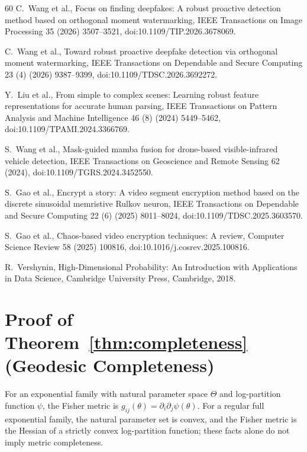 \documentclass[a4paper,fleqn]{cas-dc}
\begin{document}
\begin{thebibliography}{60}
C.~Wang et al., Focus on finding deepfakes: A robust proactive detection method based on orthogonal moment watermarking, IEEE Transactions on Image Processing 35 (2026) 3507--3521, doi:10.1109/TIP.2026.3678069.

C.~Wang et al., Toward robust proactive deepfake detection via orthogonal moment watermarking, IEEE Transactions on Dependable and Secure Computing 23 (4) (2026) 9387--9399, doi:10.1109/TDSC.2026.3692272.

Y.~Liu et al., From simple to complex scenes: Learning robust feature representations for accurate human parsing, IEEE Transactions on Pattern Analysis and Machine Intelligence 46 (8) (2024) 5449--5462, doi:10.1109/TPAMI.2024.3366769.

S.~Wang et al., Mask-guided mamba fusion for drone-based visible-infrared vehicle detection, IEEE Transactions on Geoscience and Remote Sensing 62 (2024), doi:10.1109/TGRS.2024.3452550.

S.~Gao et al., Encrypt a story: A video segment encryption method based on the discrete sinusoidal memristive Rulkov neuron, IEEE Transactions on Dependable and Secure Computing 22 (6) (2025) 8011--8024, doi:10.1109/TDSC.2025.3603570.

S.~Gao et al., Chaos-based video encryption techniques: A review, Computer Science Review 58 (2025) 100816, doi:10.1016/j.cosrev.2025.100816.

R.~Vershynin, High-Dimensional Probability: An Introduction with Applications in Data Science, Cambridge University Press, Cambridge, 2018.

\end{thebibliography}

\appendix

\section{Proof of Theorem~\ref{thm:completeness} (Geodesic Completeness)}
\label{app:completeness}

For an exponential family with natural parameter space $\Theta$ and
log-partition function $\psi$, the Fisher metric is
$g_{ij}(\theta) = \partial_i\partial_j\psi(\theta)$.  For a regular full exponential family, the natural parameter set is
convex, and the Fisher metric is the Hessian of a strictly convex
log-partition function; these facts alone do not imply metric
completeness.
\end{document}
